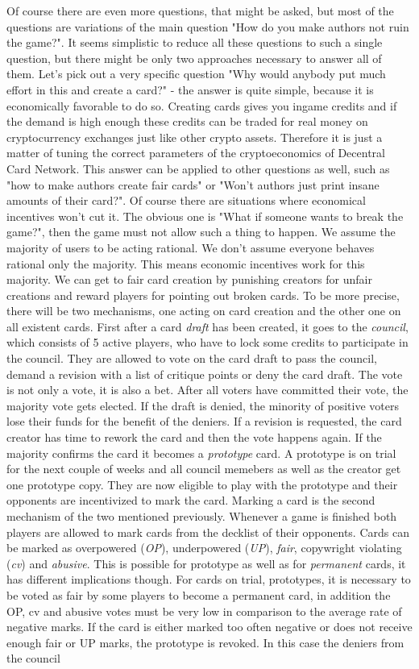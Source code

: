 \documentclass{article}
\begin{document}
%
Of course there are even more questions, that might be asked, but most of the questions are variations of the main question "How do you make authors not ruin the game?". It seems simplistic to reduce all these questions to such a single question, but there might be only two approaches necessary to answer all of them. Let's pick out a very specific question "Why would anybody put much effort in this and create a card?" - the answer is quite simple, because it is economically favorable to do so. Creating cards gives you ingame credits and if the demand is high enough these credits can be traded for real money on cryptocurrency exchanges just like other crypto assets. Therefore it is just a matter of tuning the correct parameters of the cryptoeconomics of Decentral Card Network. This answer can be applied to other questions as well, such as "how to make authors create fair cards" or "Won't authors just print insane amounts of their card?". Of course there are situations where economical incentives won't cut it. The obvious one is "What if someone wants to break the game?", then the game must not allow such a thing to happen. We assume the majority of users to be acting rational. We don't assume everyone behaves rational only the majority. This means economic incentives work for this majority. We can get to fair card creation by punishing creators for unfair creations and reward players for pointing out broken cards. To be more precise, there will be two mechanisms, one acting on card creation and the other one on all existent cards. First after a card \textit{draft} has been created, it goes to the \textit{council}, which consists of 5 active players, who have to lock some credits to participate in the council. They are allowed to vote on the card draft to pass the council, demand a revision with a list of critique points or deny the card draft. The vote is not only a vote, it is also a bet. After all voters have committed their vote, the majority vote gets elected. If the draft is denied, the minority of positive voters lose their funds for the benefit of the deniers. If a revision is requested, the card creator has time to rework the card and then the vote happens again. If the majority confirms the card it becomes a \textit{prototype} card. A prototype is on trial for the next couple of weeks and all council memebers as well as the creator get one prototype copy. They are now eligible to play with the prototype and their opponents are incentivized to mark the card. Marking a card is the second mechanism of the two mentioned previously. Whenever a game is finished both players are allowed to mark cards from the decklist of their opponents. Cards can be marked as overpowered (\textit{OP}), underpowered (\textit{UP}), \textit{fair}, copywright violating (\textit{cv}) and \textit{abusive}. This is possible for prototype as well as for \textit{permanent} cards, it has different implications though. For cards on trial, prototypes, it is necessary to be voted as fair by some players to become a permanent card, in addition the OP, cv and abusive votes must be very low in comparison to the average rate of negative marks. If the card is either marked too often negative or does not receive enough fair or UP marks, the prototype is revoked. In this case the deniers from the council 
\end{document}
